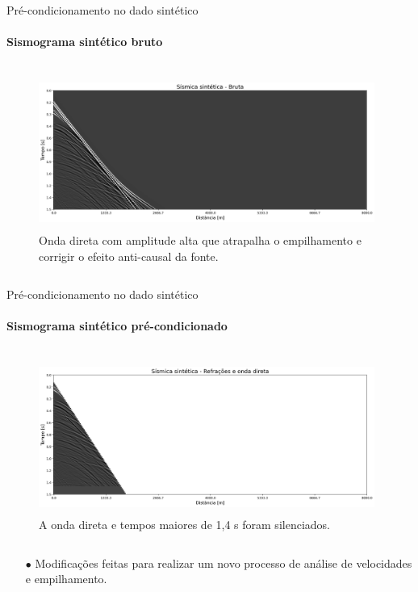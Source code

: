 \documentclass[xcolor=dvipsnames,t]{beamer}
\begin{document}
\begin{frame}{Pré-condicionamento no dado sintético}
\framesubtitle{Sismograma sintético bruto}	
	
	\pause
	\begin{columns}[onlytextwidth, T]
		\begin{column}{.9\textwidth}
			\begin{figure}[h]
				\includegraphics[width=11cm,height=5cm]{../imagens/sismicaSinteticaBruta.png}	
				\tiny{\caption{Onda direta com amplitude alta que atrapalha o empilhamento e corrigir o efeito anti-causal da fonte.}} 	
			\end{figure}			
		\end{column}
	\end{columns}	
	
\end{frame}
\begin{frame}{Pré-condicionamento no dado sintético}
	\framesubtitle{Sismograma sintético pré-condicionado}	
	
	\begin{columns}[onlytextwidth, T]
		\begin{column}{.9\textwidth}
			\begin{figure}[h]
				\includegraphics[width=11cm,height=5cm]{../imagens/sismicaMute.png}	
				\tiny{\caption{A onda direta e tempos maiores de 1,4 s foram silenciados.}} 	
			\end{figure}			
		\end{column}
	\end{columns}	
	
\begin{itemize}
	\small
	\item[$\bullet$] Modificações feitas para realizar um novo processo de análise de velocidades e empilhamento.
\end{itemize}		
	
\end{frame}
\end{document}
